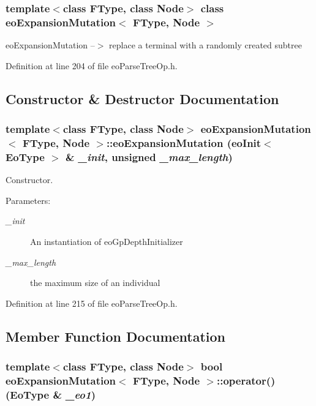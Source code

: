 \subsubsection*{template$<$class FType, class Node$>$ class eo\-Expansion\-Mutation$<$ FType, Node $>$}

eo\-Expansion\-Mutation --$>$ replace a terminal with a randomly created subtree 



Definition at line 204 of file eo\-Parse\-Tree\-Op.h.

\subsection{Constructor \& Destructor Documentation}
\subsubsection{\setlength{\rightskip}{0pt plus 5cm}template$<$class FType, class Node$>$ {\bf eo\-Expansion\-Mutation}$<$ FType, Node $>$::{\bf eo\-Expansion\-Mutation} ({\bf eo\-Init}$<$ {\bf Eo\-Type} $>$ \& {\em \_\-init}, unsigned {\em \_\-max\_\-length})\hspace{0.3cm}{\tt  [inline]}}\label{classeo_expansion_mutation_a0}


Constructor. 

\begin{Desc}
\item[Parameters:]
\begin{description}
\item[{\em \_\-init}]An instantiation of eo\-Gp\-Depth\-Initializer \item[{\em \_\-max\_\-length}]the maximum size of an individual \end{description}
\end{Desc}


Definition at line 215 of file eo\-Parse\-Tree\-Op.h.

\subsection{Member Function Documentation}
\subsubsection{\setlength{\rightskip}{0pt plus 5cm}template$<$class FType, class Node$>$ bool {\bf eo\-Expansion\-Mutation}$<$ FType, Node $>$::operator() ({\bf Eo\-Type} \& {\em \_\-eo1})\hspace{0.3cm}{\tt  [inline]}}\label{classeo_expansion_mutation_a3}


